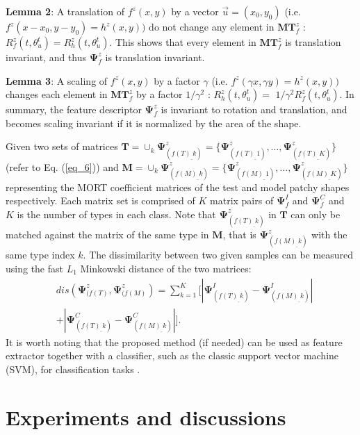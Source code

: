 \documentclass[letterpaper]{article} %
\begin{document}
\textbf{Lemma 2}: A translation of $f^z (x,y)$ by a vector $
\Vec{u}=(x_0,y_0)$ (i.e. $f^z (x-x_0,y-y_0 )=h^z (x,y))$ do not change any element in $\boldsymbol{MT}_f^z$ : $R_f^z (t,\theta_u^t )=R_h^z (t,\theta_u^t )$. This shows that every element in $\boldsymbol{MT}_f^z$ is translation invariant, and thus $\boldsymbol{\Psi}_f^z$ is translation invariant. 

\textbf{Lemma 3}: A scaling of $f^z (x,y)$ by a factor $\gamma$ (i.e. $f^z (\gamma x,\gamma y)=h^z (x,y))$ changes each element in $\boldsymbol{MT}_f^z$ by a factor $1/\gamma^2$ : $R_h^z (t,\theta_u^t )=$  $1/\gamma^2 R_f^z (t,\theta_u^t )$.  In summary, the feature descriptor $\boldsymbol{\Psi}_f^z$ is invariant to rotation and translation, and becomes scaling invariant if it is normalized by the area of the shape.

Given two sets of matrices $\boldsymbol{T}= \cup_k \boldsymbol{\Psi}^z_{(f(T)_\_k)} =\{ \boldsymbol{\Psi}^z_{(f(T)_\_1)} ,\dots, \boldsymbol{\Psi}^z_{(f(T)_\_K)} \}$ (refer to Eq. (\ref{eq_6})) and $\boldsymbol{M}= \cup_k \boldsymbol{\Psi}^z_{(f(M)_\_k)} =\{ \boldsymbol{\Psi}^z_{(f(M)_\_1)} ,\dots, \boldsymbol{\Psi}^z_{(f(M)_\_K)} \}$ representing the MORT coefficient matrices of the test and model patchy shapes respectively. Each matrix set is comprised of $K$ matrix pairs of $\boldsymbol{\Psi}^I_f$ and $\boldsymbol{\Psi}^C_f$ and $K$ is the number of types in each class. Note that $\boldsymbol{\Psi}^z_{(f(T)_\_k)}$ in $\boldsymbol{T}$ can only be matched against the matrix of the same type in $\boldsymbol{M}$, that is $\boldsymbol{\Psi}^z_{(f(M)_\_k)}$  with the same type index $k$.
The dissimilarity between two given samples can be measured using the fast $L_1$ Minkowski distance of the two matrices:
\begin{equation}
\begin{aligned}
    & dis(\boldsymbol{\Psi}^z_{(f(T)},\boldsymbol{\Psi}^z_{(f(M)})
    = \sum_{k=1}^K[|\boldsymbol{\Psi}^I_{(f(T)_\_k)}-\boldsymbol{\Psi}^I_{(f(M)_\_k)}| \\
    & +|\boldsymbol{\Psi}^C_{(f(T)_\_k)}-\boldsymbol{\Psi}^C_{(f(M)_\_k)}|].
\end{aligned}
\label{eq_7}
\end{equation}
It is worth noting that the proposed method (if needed) can be used as feature extractor together with a classifier, such as the classic support vector machine (SVM), for classification tasks \cite{17}.  




\section{Experiments and discussions}
\end{document}
